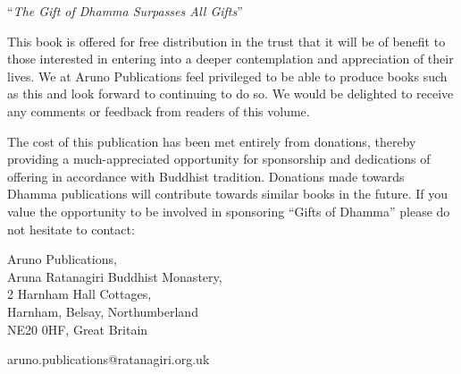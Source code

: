 \begin{quotepage}{0.9\textwidth}
\centering
``\emph{The Gift of Dhamma Surpasses All Gifts}''\\[0.2\baselineskip]
\smaller
{}


This book is offered for free distribution in the trust that it will be of
benefit to those interested in entering into a deeper contemplation and
appreciation of their lives. We at Aruno Publications feel privileged to be
able to produce books such as this and look forward to continuing to do so. We
would be delighted to receive any comments or feedback from readers of this
volume.

The cost of this publication has been met entirely from donations, thereby
providing a much-appreciated opportunity for sponsorship and dedications of
offering in accordance with Buddhist tradition.  Donations made towards Dhamma
publications will contribute towards similar books in the future.  If you value
the opportunity to be involved in sponsoring ``Gifts of Dhamma'' please do not
hesitate to contact:

Aruno Publications,\\
Aruna Ratanagiri Buddhist Monastery,\\
2 Harnham Hall Cottages,\\
Harnham, Belsay, Northumberland\\
NE20 0HF, Great Britain\\

\bigskip

aruno.publications@ratanagiri.org.uk
\end{quotepage}



